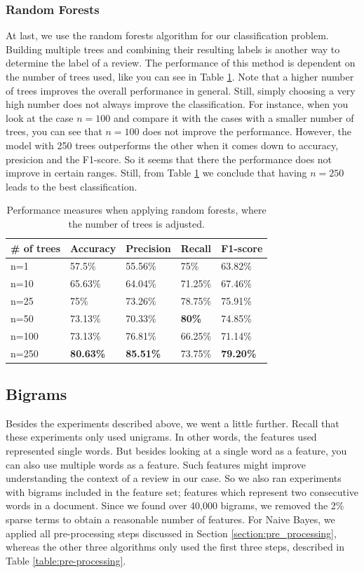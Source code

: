 \documentclass[a4paper,11pt]{article}
\begin{document}
\subsubsection{Random Forests}
At last, we use the random forests algorithm for our classification problem. Building multiple trees and combining their resulting labels is another way to determine the label of a review. The performance of this method is dependent on the number of trees used, like you can see in Table \ref{table:forests}. Note that a higher number of trees improves the overall performance in general. Still, simply choosing a very high number does not always improve the classification. For instance, when you look at the case $n=100$ and compare it with the cases with a smaller number of trees, you can see that $n=100$ does not improve the performance. However, the model with 250 trees outperforms the other when it comes down to accuracy, presicion and the F1-score. So it seems that there the performance does not improve in certain ranges. Still, from Table \ref{table:forests} we conclude that having $n=250$ leads to the best classification.
\begin{table}[H]
\centering
\caption{Performance measures when applying random forests, where the number of trees is adjusted.}
\label{table:forests}
\begin{tabular}{|l|l|l|l|l|}
\hline
\# of trees & Accuracy & Precision & Recall  & F1-score \\
\hline
n=1             & 57.5\%   & 55.56\%   & 75\%    & 63.82\%  \\
n=10            & 65.63\%  & 64.04\%   & 71.25\% & 67.46\%  \\
n=25			& 75\%	   & 73.26\%   & 78.75\% & 75.91\%  \\
n=50            & 73.13\%  & 70.33\%   & \textbf{80\%}    & 74.85\%  \\
n=100           & 73.13\%  & 76.81\%   & 66.25\% & 71.14\%  \\
n=250           & \textbf{80.63\%}  & \textbf{85.51\%}   & 73.75\% & \textbf{79.20\%}  \\
\hline
\end{tabular}
\end{table}

\subsection{Bigrams}
Besides the experiments described above, we went a little further. Recall that these experiments only used unigrams. In other words, the features used represented single words. But besides looking at a single word as a feature, you can also use multiple words as a feature. Such features might improve understanding the context of a review in our case. So we also ran experiments with bigrams included in the feature set; features which represent two consecutive words in a document. Since we found over 40,000 bigrams, we removed the 2\% sparse terms to obtain a reasonable number of features. For Naive Bayes, we applied all pre-processing steps discussed in Section \ref{section:pre_processing}, whereas the other three algorithms only used the first three steps, described in Table \ref{table:pre-processing}.\\
\end{document}
